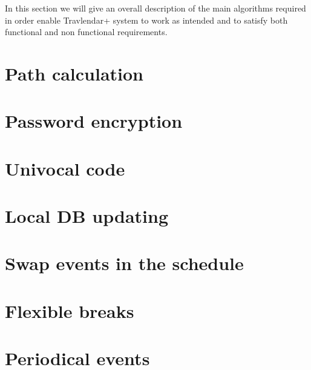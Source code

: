 In this section we will give an overall description of the main algorithms required in order enable Travlendar+ system to work as intended and to satisfy both functional and non functional requirements.

\section{Path calculation}
\label{sect:Path calculation}
	

\section{Password encryption}
\label{sect: Password encryption}
	

\section{Univocal code}
\label{sect: Univocal code}
	

\section{Local DB updating}
\label{sect: Local DB updating}
	

\section{Swap events in the schedule}
\label{sect: Swap events in the schedule}
	

\section{Flexible breaks}
\label{sect: Flexible breaks}
	

\section{Periodical events}
\label{sect: Periodical events}
	

